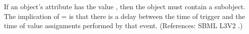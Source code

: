 If an \Event object's  attribute has the
value , then the \Event object must contain a \Delay subobject.
The implication of = is that
there is a delay between the time of trigger and the time of value
assignments performed by that event.  (References: SBML L3V2
.)
